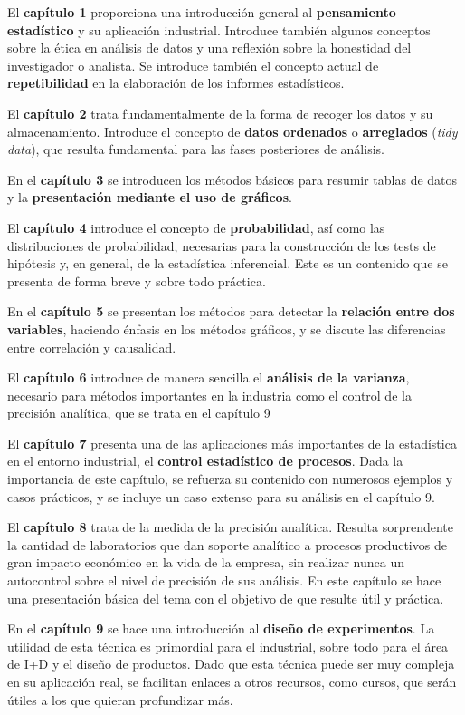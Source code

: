 \documentclass[
  letterpaper,
]{scrbook}
\begin{document}
El \textbf{capítulo 1} proporciona una introducción general al
\textbf{pensamiento estadístico} y su aplicación industrial. Introduce
también algunos conceptos sobre la ética en análisis de datos y una
reflexión sobre la honestidad del investigador o analista. Se introduce
también el concepto actual de \textbf{repetibilidad} en la elaboración
de los informes estadísticos.

El \textbf{capítulo 2} trata fundamentalmente de la forma de recoger los
datos y su almacenamiento. Introduce el concepto de \textbf{datos
ordenados} o \textbf{arreglados} (\emph{tidy data}), que resulta
fundamental para las fases posteriores de análisis.

En el \textbf{capítulo 3} se introducen los métodos básicos para resumir
tablas de datos y la \textbf{presentación mediante el uso de gráficos}.

El \textbf{capítulo 4} introduce el concepto de \textbf{probabilidad},
así como las distribuciones de probabilidad, necesarias para la
construcción de los tests de hipótesis y, en general, de la estadística
inferencial. Este es un contenido que se presenta de forma breve y sobre
todo práctica.

En el \textbf{capítulo 5} se presentan los métodos para detectar la
\textbf{relación entre dos variables}, haciendo énfasis en los métodos
gráficos, y se discute las diferencias entre correlación y causalidad.

El \textbf{capítulo 6} introduce de manera sencilla el \textbf{análisis
de la varianza}, necesario para métodos importantes en la industria como
el control de la precisión analítica, que se trata en el capítulo 9

El \textbf{capítulo 7} presenta una de las aplicaciones más importantes
de la estadística en el entorno industrial, el \textbf{control
estadístico de procesos}. Dada la importancia de este capítulo, se
refuerza su contenido con numerosos ejemplos y casos prácticos, y se
incluye un caso extenso para su análisis en el capítulo 9.

El \textbf{capítulo 8} trata de la medida de la precisión analítica.
Resulta sorprendente la cantidad de laboratorios que dan soporte
analítico a procesos productivos de gran impacto económico en la vida de
la empresa, sin realizar nunca un autocontrol sobre el nivel de
precisión de sus análisis. En este capítulo se hace una presentación
básica del tema con el objetivo de que resulte útil y práctica.

En el \textbf{capítulo 9} se hace una introducción al \textbf{diseño de
experimentos}. La utilidad de esta técnica es primordial para el
industrial, sobre todo para el área de I+D y el diseño de productos.
Dado que esta técnica puede ser muy compleja en su aplicación real, se
facilitan enlaces a otros recursos, como cursos, que serán útiles a los
que quieran profundizar más.
\end{document}
